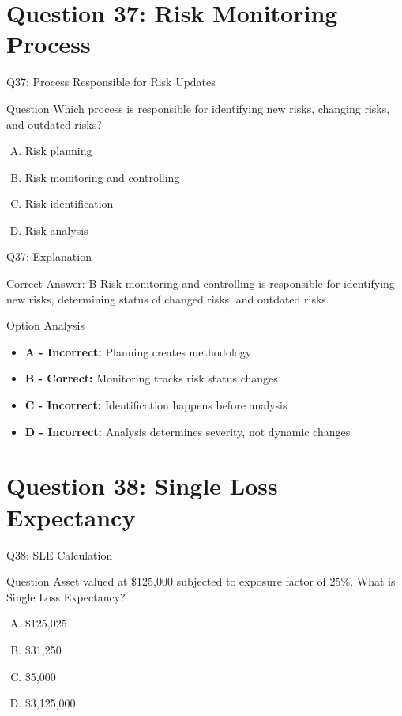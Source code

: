 \documentclass{beamer}
\begin{document}
	\section{Question 37: Risk Monitoring Process}
	
	\begin{frame}{Q37: Process Responsible for Risk Updates}
		\begin{block}{Question}
			Which process is responsible for identifying new risks, changing risks, and outdated risks?
		\end{block}
		\begin{enumerate}[(A)]
			\item Risk planning
			\item Risk monitoring and controlling
			\item Risk identification
			\item Risk analysis
		\end{enumerate}
	\end{frame}
	
	\begin{frame}{Q37: Explanation}
		\begin{block}{Correct Answer: B}
			Risk monitoring and controlling is responsible for identifying new risks, determining status of changed risks, and outdated risks.
		\end{block}
		\begin{block}{Option Analysis}
			\begin{itemize}
				\item \textbf{A - Incorrect:} Planning creates methodology
				\item \textbf{B - Correct:} Monitoring tracks risk status changes
				\item \textbf{C - Incorrect:} Identification happens before analysis
				\item \textbf{D - Incorrect:} Analysis determines severity, not dynamic changes
			\end{itemize}
		\end{block}
	\end{frame}
	
	\section{Question 38: Single Loss Expectancy}
	
	\begin{frame}{Q38: SLE Calculation}
		\begin{block}{Question}
			Asset valued at \$125,000 subjected to exposure factor of 25\%. What is Single Loss Expectancy?
		\end{block}
		\begin{enumerate}[(A)]
			\item \$125,025
			\item \$31,250
			\item \$5,000
			\item \$3,125,000
		\end{enumerate}
	\end{frame}
	
\end{document}
